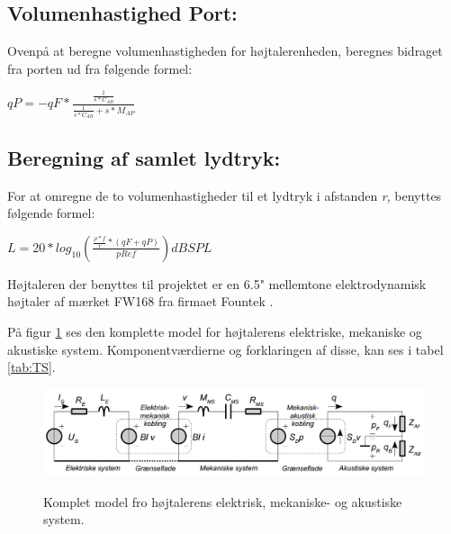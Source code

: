\subsection{Volumenhastighed Port:}

Ovenpå at beregne volumenhastigheden for højtalerenheden, beregnes bidraget fra porten ud fra følgende formel:

{\Large\(qP=-qF*\)}{\huge \(\frac{\frac{1}{s*C_{AB}}}{\frac{1}{s*C_{AB}}+s*M_{AP}}\) }


\subsection{Beregning af samlet lydtryk:}

For at omregne de to volumenhastigheder til et lydtryk i afstanden \textit{r}, benyttes følgende formel:

\(L=20*log_{10}(\frac{\frac{\rho*f}{r}*(qF+qP)}{pRef}) dB SPL\)

Højtaleren der benyttes til projektet er en 6.5" mellemtone elektrodynamisk højtaler af mærket FW168\cite{FW168} fra firmaet Fountek \cite{Fountek}. 

På figur \ref{fig:kompletmodel} ses den komplette model for højtalerens elektriske, mekaniske og akustiske system.\citep{Elektroakustik} Komponentværdierne og forklaringen af disse, kan ses i tabel \ref{tab:TS}.

\begin{figure}[H]
	\centering
	\includegraphics[width=\textwidth]{Pics/kompletmodel.PNG}
	\label{fig:kompletmodel}
	\caption{Komplet model fro højtalerens elektrisk, mekaniske- og akustiske system. } 
\end{figure}


